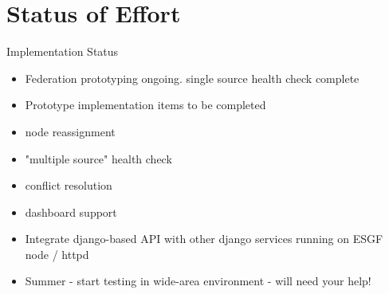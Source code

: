 \documentclass{beamer}
\begin{document}
\section{Status of Effort}
\begin{frame}{Implementation Status}

\begin{itemize}
\item
Federation prototyping ongoing.   single source health check complete
\item
 Prototype implementation items to be completed
 \item
  node reassignment
\item
"multiple source" health check
\item

 conflict resolution
\item

 dashboard support
\item
Integrate django-based API with other django services running on ESGF node / httpd

 \item

Summer - start testing in wide-area environment - will need your help!
\end{itemize}
\end{frame}
\end{document}
